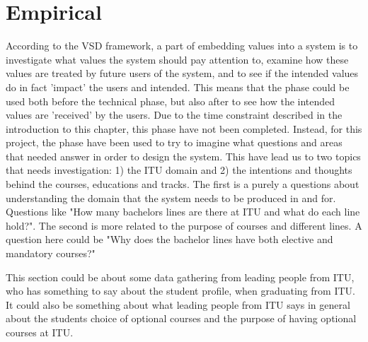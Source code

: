 \section{Empirical}
According to the VSD framework, a part of embedding values into a system is to investigate what values the system should pay attention to, examine how these values are treated by future users of the system, and to see if the intended values do in fact 'impact' the users and intended. This means that the phase could be used both before the technical phase, but also after to see how the intended values are 'received' by the users. \newline
Due to the time constraint described in the introduction to this chapter, this phase have not been completed. Instead, for this project, the phase have been used to try to imagine what questions and areas that needed answer in order to design the system. This have lead us to two topics that needs investigation: 1) the ITU domain and 2) the intentions and thoughts behind the courses, educations and tracks. The first is a purely a questions about understanding the domain that the system needs to be produced in and for. Questions like "How many bachelors lines are there at ITU and what do each line hold?". The second is more related to the purpose of courses and different lines. A question here could be "Why does the bachelor lines have both elective and mandatory courses?"

This section could be about some data gathering from leading people from ITU, who has something to say about the student profile, when graduating from ITU. It could also be something about what leading people from ITU says in general about the students choice of optional courses and the purpose of having optional courses at ITU. 




